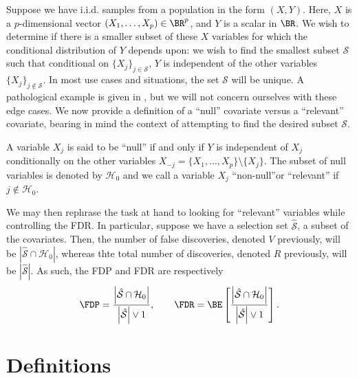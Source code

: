 Suppose we have i.i.d. samples from a population in the form $(X, Y)$. Here, $X$ is a $p$-dimensional vector $(X_1, \ldots, X_p) \in \BR^p$, and $Y$ is a scalar in $\BR$. We wish to determine if there is a smaller subset of these $X$ variables for which the conditional distribution of $Y$ depends upon: we wish to find the smallest subset $\mathcal{S}$ such that conditional on $\{ X_j \}_{j \in \mathcal{S}}$, $Y$ is independent of the other variables $\{ X_j \}_{j \not \in \mathcal{S}}$. In most use cases and situations, the set $\mathcal{S}$ will be unique. A pathological example is given in \cite{panning}, but we will not concern ourselves with these edge cases. We now provide a definition of a ``null'' covariate versus a ``relevant'' covariate, bearing in mind the context of attempting to find the desired subset $\mathcal{S}$.
\begin{defn}
A variable $X_j$ is said to be ``null'' if and only if $Y$ is independent of $X_j$ conditionally on the other variables $X_{-j} = \{ X_1, \ldots, X_p \} \setminus \{ X_j\}$. The subset of null variables is denoted by $\mathcal{H}_0$ and we call a variable $X_j$ ``non-null''or ``relevant'' if $j \not \in \mathcal{H}_0$.
\end{defn}
We may then rephrase the task at hand to looking for ``relevant'' variables while controlling the FDR. In particular, suppose we have a selection set $\hat{\mathcal{S}}$, a subset of the covariates. Then, the number of false discoveries, denoted $V$ previously, will be $\left| \hat{\mathcal{S}} \cap \mathcal{H}_0 \right|$, whereas thte total number of discoveries, denoted $R$ previously, will be $\left| \hat{\mathcal{S}} \right|$. As such, the FDP and FDR are respectively
\begin{equation}
\FDP = \frac{\left| \hat{\mathcal{S}} \cap \mathcal{H}_0 \right|}{\left| \hat{\mathcal{S}} \right| \vee 1}, \qquad \FDR = \BE \left[ \frac{\left| \hat{\mathcal{S}} \cap \mathcal{H}_0 \right|}{\left| \hat{\mathcal{S}} \right| \vee 1} \right].
\end{equation}

\section{Definitions}
